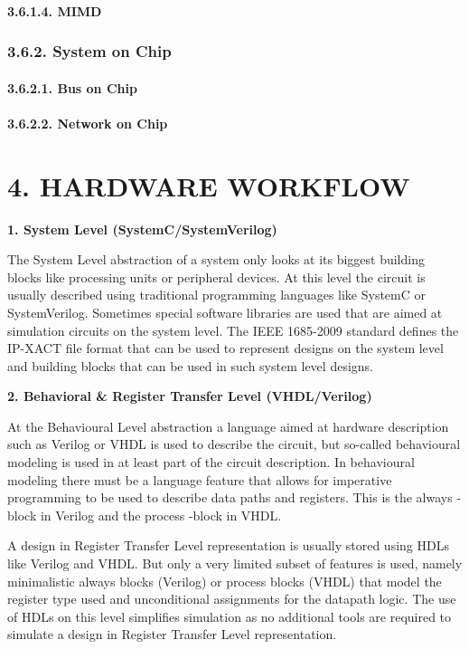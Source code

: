 \documentclass[]{article}
\let\oldparagraph\paragraph
\renewcommand{\paragraph}[1]{\oldparagraph{#1}\mbox{}}
\begin{document}
\paragraph{3.6.1.4. MIMD}\label{mimd}

\subsubsection{3.6.2. System on Chip}\label{system-on-chip}

\paragraph{3.6.2.1. Bus on Chip}\label{bus-on-chip}

\paragraph{3.6.2.2. Network on Chip}\label{network-on-chip}

\section{4. HARDWARE WORKFLOW}\label{hardware-workflow}

\textbf{1. System Level (SystemC/SystemVerilog)}

The System Level abstraction of a system only looks at its biggest
building blocks like processing units or peripheral devices. At this
level the circuit is usually described using traditional programming
languages like SystemC or SystemVerilog. Sometimes special software
libraries are used that are aimed at simulation circuits on the system
level. The IEEE 1685-2009 standard defines the IP-XACT file format that
can be used to represent designs on the system level and building blocks
that can be used in such system level designs.

\textbf{2. Behavioral \& Register Transfer Level (VHDL/Verilog)}

At the Behavioural Level abstraction a language aimed at hardware
description such as Verilog or VHDL is used to describe the circuit, but
so-called behavioural modeling is used in at least part of the circuit
description. In behavioural modeling there must be a language feature
that allows for imperative programming to be used to describe data paths
and registers. This is the always -block in Verilog and the process
-block in VHDL.

A design in Register Transfer Level representation is usually stored
using HDLs like Verilog and VHDL. But only a very limited subset of
features is used, namely minimalistic always blocks (Verilog) or process
blocks (VHDL) that model the register type used and unconditional
assignments for the datapath logic. The use of HDLs on this level
simplifies simulation as no additional tools are required to simulate a
design in Register Transfer Level representation.
\end{document}
